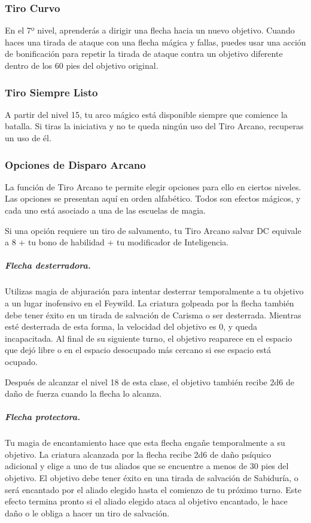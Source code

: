 \documentclass[a4paper,twocolumn,openany,10pt]{dndbook}
\begin{document}
\subsubsection{Tiro Curvo}
En el 7º nivel, aprenderás a dirigir una flecha hacia un nuevo objetivo. Cuando haces una tirada de ataque con una flecha
mágica y fallas, puedes usar una acción de bonificación para repetir la tirada de ataque contra un objetivo diferente dentro de
los 60 pies del objetivo original.

\subsubsection{Tiro Siempre Listo}
A partir del nivel 15, tu arco mágico está disponible siempre que comience la batalla. Si tiras la iniciativa y no te queda
ningún uso del Tiro Arcano, recuperas un uso de él.

\subsubsection{Opciones de Disparo Arcano}
La función de Tiro Arcano te permite elegir opciones para ello en ciertos niveles. Las opciones se presentan aquí en orden
alfabético. Todos son efectos mágicos, y cada uno está asociado a una de las escuelas de magia.

Si una opción requiere un tiro de salvamento, tu Tiro Arcano salvar DC equivale a 8 + tu bono de habilidad + tu modificador de
Inteligencia. 

\subparagraph{Flecha desterradora.} Utilizas magia de abjuración para intentar desterrar temporalmente a tu objetivo a un lugar
inofensivo en el Feywild. La criatura golpeada por la flecha también debe tener éxito en un tirada de salvación de Carisma o ser
desterrada. Mientras esté desterrada de esta forma, la velocidad del objetivo es 0, y queda incapacitada. Al final de su
siguiente turno, el objetivo reaparece en el espacio que dejó libre o en el espacio desocupado más cercano si ese espacio está
ocupado.

Después de alcanzar el nivel 18 de esta clase, el objetivo también recibe 2d6 de daño de fuerza cuando la flecha lo alcanza.

\subparagraph{Flecha protectora.} Tu magia de encantamiento hace que esta flecha engañe temporalmente a su objetivo. La
criatura alcanzada por la flecha recibe 2d6 de daño psíquico adicional y elige a uno de tus aliados que se encuentre a menos de
30 pies del objetivo. El objetivo debe tener éxito en una tirada de salvación de Sabiduría, o será encantado por el aliado
elegido hasta el comienzo de tu próximo turno. Este efecto termina pronto si el aliado elegido ataca al objetivo encantado,
le hace daño o le obliga a hacer un tiro de salvación.
\end{document}
